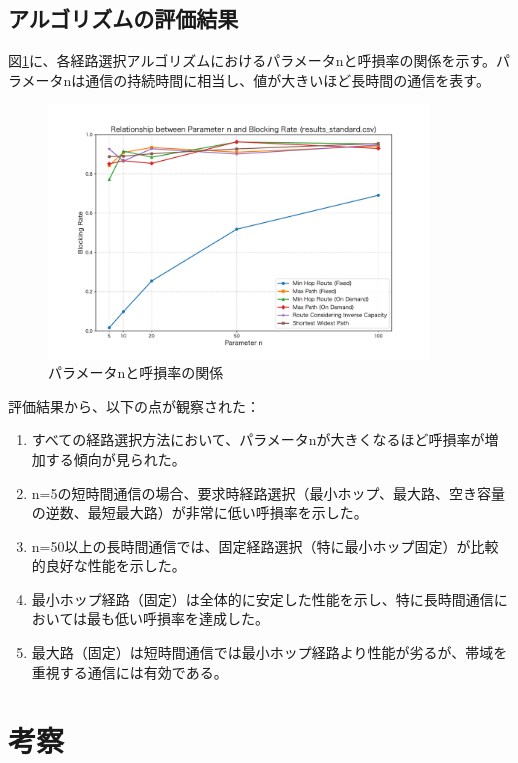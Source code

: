 \documentclass[a4paper,11pt]{jsarticle}
\begin{document}
\subsection{アルゴリズムの評価結果}
図\ref{fig:result}に、各経路選択アルゴリズムにおけるパラメータnと呼損率の関係を示す。パラメータnは通信の持続時間に相当し、値が大きいほど長時間の通信を表す。

\begin{figure}[htbp]
  \centering
  \includegraphics[width=0.9\textwidth,keepaspectratio]{blocking_rate.pdf}
  \caption{パラメータnと呼損率の関係}
  \label{fig:result}
\end{figure}

評価結果から、以下の点が観察された：

\begin{enumerate}
  \item すべての経路選択方法において、パラメータnが大きくなるほど呼損率が増加する傾向が見られた。
  \item n=5の短時間通信の場合、要求時経路選択（最小ホップ、最大路、空き容量の逆数、最短最大路）が非常に低い呼損率を示した。
  \item n=50以上の長時間通信では、固定経路選択（特に最小ホップ固定）が比較的良好な性能を示した。
  \item 最小ホップ経路（固定）は全体的に安定した性能を示し、特に長時間通信においては最も低い呼損率を達成した。
  \item 最大路（固定）は短時間通信では最小ホップ経路より性能が劣るが、帯域を重視する通信には有効である。
\end{enumerate}

\section{考察}
\end{document}
